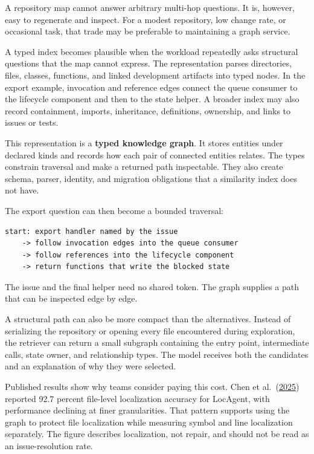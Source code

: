 A repository map cannot answer arbitrary multi-hop questions. It is, however, easy to regenerate and inspect. For a modest repository, low change rate, or occasional task, that trade may be preferable to maintaining a graph service.

A typed index becomes plausible when the workload repeatedly asks structural questions that the map cannot express. The representation parses directories, files, classes, functions, and linked development artifacts into typed nodes. In the export example, invocation and reference edges connect the queue consumer to the lifecycle component and then to the state helper. A broader index may also record containment, imports, inheritance, definitions, ownership, and links to issues or tests.

This representation is a \textbf{typed knowledge graph}. It stores entities under declared kinds and records how each pair of connected entities relates. The types constrain traversal and make a returned path inspectable. They also create schema, parser, identity, and migration obligations that a similarity index does not have.

The export question can then become a bounded traversal:

\begin{verbatim}
start: export handler named by the issue
    -> follow invocation edges into the queue consumer
    -> follow references into the lifecycle component
    -> return functions that write the blocked state
\end{verbatim}

The issue and the final helper need no shared token. The graph supplies a path that can be inspected edge by edge.

A structural path can also be more compact than the alternatives. Instead of serializing the repository or opening every file encountered during exploration, the retriever can return a small subgraph containing the entry point, intermediate calls, state owner, and relationship types. The model receives both the candidates and an explanation of why they were selected.

Published results show why teams consider paying this cost. Chen et al.~(\href{https://arxiv.org/abs/2503.09089}{2025}) reported 92.7 percent file-level localization accuracy for LocAgent, with performance declining at finer granularities. That pattern supports using the graph to protect file localization while measuring symbol and line localization separately. The figure describes localization, not repair, and should not be read as an issue-resolution rate.

